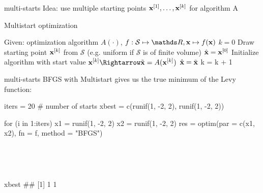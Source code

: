 \documentclass[11pt,compress,t,notes=noshow, xcolor=table]{beamer}
\begin{document}
\begin{frame2}{multi-starts}
Idea: use multiple starting points $\mathbf{x}^{[1]}, \ldots, \mathbf{x}^{[k]}$ for algorithm A
\begin{algorithm}[H]
\begin{footnotesize}
\begin{center}
\caption{Multistart optimization}
\begin{algorithmic}[1]
\State Given: optimization algorithm $A(\cdot)$, $f: \mathcal{S} \mapsto \R, \xv \mapsto f(\xv)$
\State $k = 0$
\Repeat
\State Draw starting point  $\mathbf{x}^{[k]}$ from $\mathcal{S}$ (e.g. uniform if $\mathcal{S}$ is of finite volume)
  $\hat{\mathbf{x}}= \mathbf{x}^{[0]}$
\EndIf
\State Initialize algorithm with start value $\xv^{[k]} \Rightarrow \tilde{\xv} = A(\xv^{[k]})$
  $\hat{\mathbf{x}} = \tilde{\mathbf{x}}$
\EndIf
\State k = k + 1
\\
\Return{$\hat{\xv}$}
\end{algorithmic}
\end{center}
\end{footnotesize}
\end{algorithm}
\end{frame2}


\begin{vbframe}{multi-starts}
BFGS with Multistart gives us the true minimum of the Levy function:\\
\lz
\begin{verbbox}
iters = 20 # number of starts
xbest = c(runif(1, -2, 2), runif(1, -2, 2))
\end{verbbox}
\theverbbox
\vspace{0.4cm}
\begin{verbbox}
for (i in 1:iters) {
x1 = runif(1, -2, 2)
x2 = runif(1, -2, 2)
res = optim(par = c(x1, x2), fn = f, method = "BFGS")
}
\end{verbbox}
\theverbbox\\
\lz
{}
\theverbbox\\
\lz
\begin{verbbox}
xbest
## [1] 1 1
\end{verbbox}
\theverbbox
\end{vbframe}


\endlecture
\end{document}
